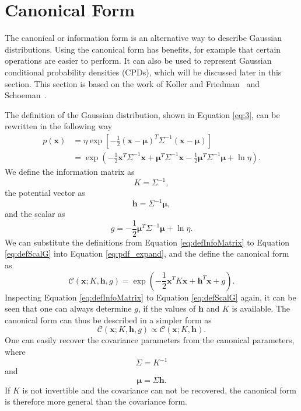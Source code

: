 \documentclass[12pt,oneside,openany,a4paper, %
afrikaans,english,
]{memoir}
\numberwithin{equation}{chapter}
\begin{document}
\section{Canonical Form}\label{sec:canonical}
The canonical or information form is an alternative way to describe Gaussian distributions. Using the canonical form has benefits, for example that certain operations are easier to perform. It can also be used to represent Gaussian conditional probability densities (CPDs), which will be discussed later in this section. This section is based on the work of Koller and Friedman~\cite{koller} and Schoeman~\citep{JC}.

The definition of the Gaussian distribution, shown in Equation \ref{eq:3}, can be rewritten in the following way
\begin{equation}
\begin{split}\label{eq:pdf_expand}
p(\bm{x}) & = \eta\exp\left[-\frac{1}{2}(\bm{x}-\bm{\mu})^T\Sigma^{-1}(\bm{x}-\bm{\mu})\right]\\
& = \exp\left(-\frac{1}{2}\bm{x}^T\Sigma^{-1}\bm{x} + \bm{\mu}^T\Sigma^{-1}\bm{x} - \frac{1}{2}\bm{\mu}^T\Sigma^{-1}\bm{\mu} + \ln{\eta}\right).
\end{split}
\end{equation}
We define the information matrix as
\begin{equation}\label{eq:defInfoMatrix}
K = \Sigma^{-1},
\end{equation}
the potential vector as
\begin{equation}\label{eq:defPotVec}
\bm{h} = \Sigma^{-1}\bm{\mu},
\end{equation}
and the scalar as
\begin{equation}\label{eq:defScalG}
g = - \frac{1}{2}\bm{\mu}^T\Sigma^{-1}\bm{\mu} + \ln{\eta}.
\end{equation}
We can substitute the definitions from Equation \ref{eq:defInfoMatrix} to Equation \ref{eq:defScalG} into Equation \ref{eq:pdf_expand}, and the define the canonical form as
\begin{equation}\label{eq:defCanonical}
\mathcal{C}(\bm{x}; K,\bm{h},g) = \exp\left(-\frac{1}{2}\bm{x}^TK\bm{x} + \bm{h}^T\bm{x} +g \right).
\end{equation}
Inspecting Equation \ref{eq:defInfoMatrix} to Equation \ref{eq:defScalG} again, it can be seen that one can always determine $g$, if the values of $\bm{h}$ and $K$ is available. The canonical form can thus be described in a simpler form as
\begin{equation}
\mathcal{C}(\bm{x}; K,\bm{h},g) \propto \mathcal{C}(\bm{x}; K,\bm{h}).
\end{equation}
One can easily recover the covariance parameters from the canonical parameters, where
\begin{equation}
\Sigma = K^{-1}
\end{equation}
and
\begin{equation}
\bm{\mu} = \Sigma\bm{h}.
\end{equation}
If $K$ is not invertible and the covariance can not be recovered, the canonical form is therefore more general than the covariance form.
\end{document}
